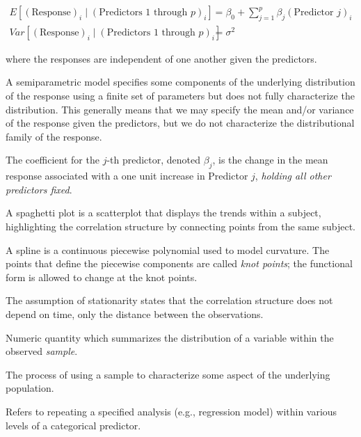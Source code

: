 \documentclass[
  letterpaper,
  DIV=11,
  numbers=noendperiod]{scrreprt}
\providecommand{\tightlist}{%
  \setlength{\itemsep}{0pt}\setlength{\parskip}{0pt}}\usepackage{longtable,booktabs,array}
\theoremstyle{definition}
\theoremstyle{definition}
\theoremstyle{remark}
\begin{document}
\[
\begin{aligned}
  E\left[(\text{Response})_i \mid (\text{Predictors 1 through } p)_i\right]
    &= \beta_0 + \sum\limits_{j=1}^{p} \beta_j (\text{Predictor } j)_i \\
  Var\left[(\text{Response})_i \mid (\text{Predictors 1 through } p)_i\right]
    &= \sigma^2
\end{aligned}
\]

where the responses are independent of one another given the predictors.

\begin{description}
\tightlist
\item[Semiparametric Model (Definition~\ref{def-semiparametric-model})]
A semiparametric model specifies some components of the underlying
distribution of the response using a finite set of parameters but does
not fully characterize the distribution. This generally means that we
may specify the mean and/or variance of the response given the
predictors, but we do not characterize the distributional family of the
response.
\item[Slope (Definition~\ref{def-slope})]
The coefficient for the \(j\)-th predictor, denoted \(\beta_j\), is the
change in the mean response associated with a one unit increase in
Predictor \(j\), \emph{holding all other predictors fixed}.
\item[Spaghetti Plot (Definition~\ref{def-spaghetti-plot})]
A spaghetti plot is a scatterplot that displays the trends within a
subject, highlighting the correlation structure by connecting points
from the same subject.
\item[Spline (Definition~\ref{def-spline})]
A spline is a continuous piecewise polynomial used to model curvature.
The points that define the piecewise components are called \emph{knot
points}; the functional form is allowed to change at the knot points.
\item[Stationarity (Definition~\ref{def-stationarity})]
The assumption of stationarity states that the correlation structure
does not depend on time, only the distance between the observations.
\item[Statistic (Definition~\ref{def-statistic})]
Numeric quantity which summarizes the distribution of a variable within
the observed \emph{sample}.
\item[Statistical Inference (Definition~\ref{def-inference})]
The process of using a sample to characterize some aspect of the
underlying population.
\item[Subgroup Analysis (Definition~\ref{def-subgroup-analysis})]
Refers to repeating a specified analysis (e.g., regression model) within
various levels of a categorical predictor.
\end{description}
\end{document}
